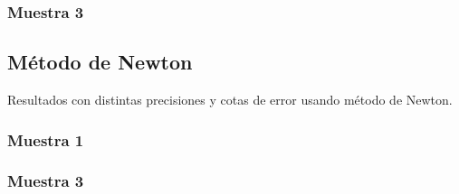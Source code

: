 \documentclass[a4paper,10pt,twoside]{article}
\begin{document}

\subsubsection{Muestra 3}






\subsection{Método de Newton}
Resultados con distintas precisiones y cotas de error usando  método de Newton.

\subsubsection{Muestra 1}


\subsubsection{Muestra 3}
\end{document}
